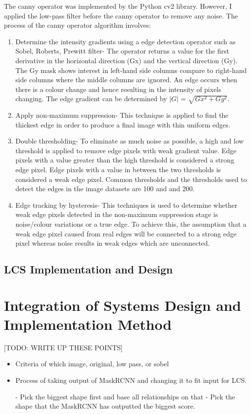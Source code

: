 The canny operator was implemented by the Python cv2 library. However, I applied the low-pass filter before the canny operator to remove any noise. The process of the canny operator algorithm involves:
\begin{enumerate}
	\item Determine the intensity gradients using a edge detection operator such as Sobel, Roberts, Prewitt filter- The operator returns a value for the first derivative in the horizontal direction (Gx) and the vertical direction (Gy). The Gy mask shows interest in left-hand side columns compare to right-hand side columns where the middle columns are ignored. An edge occurs when there is a colour change and hence resulting in the intensity of pixels changing. The edge gradient can be determined by $|G|$ = $\sqrt{Gx^{2} + Gy^{2}} $. 
	
	\item Apply non-maximum suppression- This technique is applied to find the thickest edge in order to produce a final image with thin uniform edges.
	\item Double thresholding- To eliminate as much noise as possible, a high and low threshold is applied to remove edge pixels with weak gradient value. Edge pixels with a value greater than the high threshold is considered a strong edge pixel. Edge pixels with a value in between the two thresholds is considered a weak edge pixel. Common thresholds and the thresholds used to detect the edges in the image datasets are 100 and and 200.
	\item Edge tracking by hysteresis- This techniques is used to determine whether weak edge pixels detected in the non-maximum suppression stage is noise/colour variations or a true edge. To achieve this, the assumption that a weak edge pixel caused from real edges will be connected to a strong edge pixel whereas noise results in weak edges which are unconnected. 
	
\end{enumerate}

\subsection{LCS Implementation and Design}
\section{Integration of Systems Design and Implementation Method}

[TODO: WRITE UP THESE POINTS]
\begin{itemize}


	 \item Criteria of which image, original, low pass, or sobel
	 \item Process of taking output of MaskRCNN and changing it to fit input for LCS. 
	 
	 - Pick the biggest shape first and base all relationships on that
	 - Pick the shape that the MaskRCNN has outputted the biggest score.


\end{itemize}


